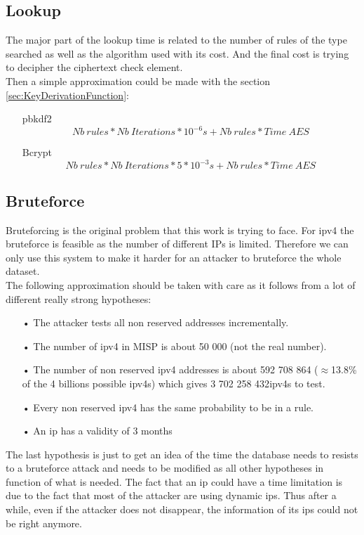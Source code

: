 \documentclass{eplmastersthesis}
\begin{document}
\subsection{Lookup}
The major part of the lookup time is related to the number of rules of the type searched as well as the algorithm used with its cost. And the final cost is trying to decipher the ciphertext check element.\\

Then a simple approximation could be made with the section \ref{sec:KeyDerivationFunction}:
\begin{itemize}
\item[\gls{pbkdf2}] $$Nb\ rules * Nb\ Iterations * 10^{-6}s + Nb\ rules * Time\ AES$$
\item[Bcrypt]  $$Nb\ rules * Nb\ Iterations * 5 * 10^{-3}s + Nb\ rules * Time\ AES$$
\end{itemize}

\subsection{Bruteforce}
Bruteforcing is the original problem that this work is trying to face. For \gls{ipv4} the bruteforce is feasible as the number of different IPs is limited. Therefore we can only use this system to make it harder for an attacker to bruteforce the whole dataset.\\

The following approximation should be taken with care as it follows from a lot of different really strong hypotheses:
\begin{itemize}
\item[•] The attacker tests all non reserved addresses incrementally.
\item[•] The number of \gls{ipv4} in MISP is about 50 000 (not the real number).
\item[•] The number of non reserved \gls{ipv4} addresses is about 592 708 864 ($\approx$13.8\% of the 4 billions possible \gls{ipv4}s) which gives 3 702 258 432\gls{ipv4}s to test.
\item[•] Every non reserved \gls{ipv4} has the same probability to be in a rule.
\item[•] An \gls{ip} has a validity of 3 months
\end{itemize}
The last hypothesis is just to get an idea of the time the database needs to resists to a bruteforce attack and needs to be modified as all other hypotheses in function of what is needed.
The fact that an \gls{ip} could have a time limitation is due to the fact that most of the attacker are using dynamic \gls{ip}s. Thus after a while, even if the attacker does not disappear, the information of its \gls{ip}s could not be right anymore.\\
\end{document}
